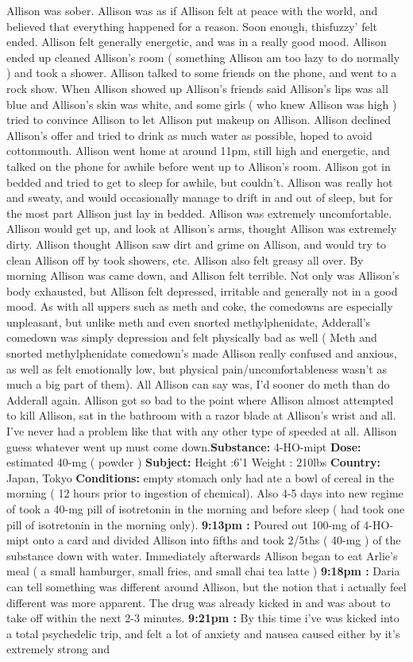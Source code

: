 \documentclass[12pt]{book}
\begin{document}
Allison was sober. Allison was as if Allison felt at peace with the world, and believed that everything happened for a reason. Soon enough, thisfuzzy' felt ended. Allison felt generally energetic, and was in a really good mood. Allison ended up cleaned Allison's room ( something Allison am too lazy to do normally ) and took a shower. Allison talked to some friends on the phone, and went to a rock show. When Allison showed up Allison's friends said Allison's lips was all blue and Allison's skin was white, and some girls ( who knew Allison was high ) tried to convince Allison to let Allison put makeup on Allison. Allison declined Allison's offer and tried to drink as much water as possible, hoped to avoid cottonmouth. Allison went home at around 11pm, still high and energetic, and talked on the phone for awhile before went up to Allison's room. Allison got in bedded and tried to get to sleep for awhile, but couldn't. Allison was really hot and sweaty, and would occasionally manage to drift in and out of sleep, but for the most part Allison just lay in bedded. Allison was extremely uncomfortable. Allison would get up, and look at Allison's arms, thought Allison was extremely dirty. Allison thought Allison saw dirt and grime on Allison, and would try to clean Allison off by took showers, etc. Allison also felt greasy all over. By morning Allison was came down, and Allison felt terrible. Not only was Allison's body exhausted, but Allison felt depressed, irritable and generally not in a good mood. As with all uppers such as meth and coke, the comedowns are especially unpleasant, but unlike meth and even snorted methylphenidate, Adderall's comedown was simply depression and felt physically bad as well ( Meth and snorted methylphenidate comedown's made Allison really confused and anxious, as well as felt emotionally low, but physical pain/uncomfortableness wasn't as much a big part of them). All Allison can say was, I'd sooner do meth than do Adderall again. Allison got so bad to the point where Allison almost attempted to kill Allison, sat in the bathroom with a razor blade at Allison's wrist and all. I've never had a problem like that with any other type of speeded at all. Allison guess whatever went up must come down.\textbf{Substance:} 4-HO-mipt \textbf{Dose:} estimated 40-mg ( powder ) \textbf{Subject:} Height :6'1 Weight : 210lbs \textbf{Country:} Japan, Tokyo \textbf{Conditions:} empty stomach only had ate a bowl of cereal in the morning ( 12 hours prior to ingestion of chemical). Also 4-5 days into new regime of took a 40-mg pill of isotretonin in the morning and before sleep ( had took one pill of isotretonin in the morning only). \textbf{9:13pm :} Poured out 100-mg of 4-HO-mipt onto a card and divided Allison into fifths and took 2/5ths ( 40-mg ) of the substance down with water. Immediately afterwards Allison began to eat Arlie's meal (  a small hamburger, small fries, and small chai tea latte ) \textbf{9:18pm :} Daria can tell something was different around Allison, but the notion that i actually feel different was more apparent. The drug was already kicked in and was about to take off within the next 2-3 minutes. \textbf{9:21pm :} By this time i've was kicked into a total psychedelic trip, and felt a lot of anxiety and nausea caused either by it's extremely strong and 
\end{document}
